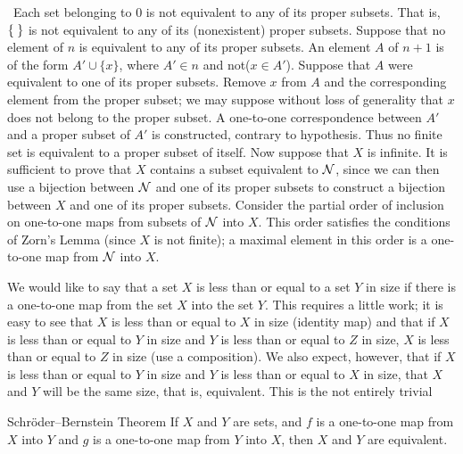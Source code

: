 \preuve\ Each set belonging to 0 is not equivalent to any of its
proper subsets.  That is, $\mbox{$\{\;\}$}$ is not equivalent to any of its
(nonexistent) proper subsets.  Suppose that no element of $n$ is
equivalent to any of its proper subsets.  An element $A$ of $n+1$ is
of the form $A' \cup \{x\}$, where $A' \in n$ and not($x \in A'$).
Suppose that $A$ were equivalent to one of
its proper subsets. 
Remove $x$ from $A$ and the corresponding element from the proper
subset; we may suppose without loss of generality that $x$ does not
belong to the proper subset.  A one-to-one
correspondence between $A'$ and a proper subset of $A'$ is
constructed, 
contrary to hypothesis.  Thus no finite set is equivalent to
a   proper subset of itself.  Now suppose that $X$ is infinite.  It is
sufficient to prove that $X$ contains a subset equivalent to ${\cal N}$, since 
we can then use a bijection between ${\cal N}$ and one of its
proper
subsets to construct a bijection between $X$ and one of its
proper subsets.  Consider the partial order of
inclusion on one-to-one maps 
from subsets of ${\cal N}$ into $X$.  This order satisfies the conditions of
Zorn's Lemma (since $X$ is not finite); a maximal element
in this order is a one-to-one map from ${\cal N}$ into
$X$.
\finpreuve

We would like to say that a set $X$ is less than or equal to a
set $Y$ in size if there is a one-to-one map from the set
$X$ into the set $Y$.  This requires a little work; it is easy to see that $X$
is less than or equal to $X$ in size (identity map) and that if $X$ is less
than or equal to $Y$ in
size and $Y$ is less than or equal to $Z$ in size, $X$ is less than or
equal to $Z$ in size (use a
composition).  We also expect, however, that if $X$ is less
than or equal to $Y$ in
size and $Y$ is less than or equal to $X$ in size, that $X$ and $Y$ will be the
same size, that is, equivalent.  This is
the not entirely trivial

\begin{Thm}{Schr\"oder--Bernstein Theorem}
  If $X$ and $Y$ are sets, and $f$ is a one-to-one map
  from $X$ into $Y$ and $g$ is a one-to-one map from $Y$ into $X$, then $X$ and
  $Y$ are equivalent.
\end{Thm}

